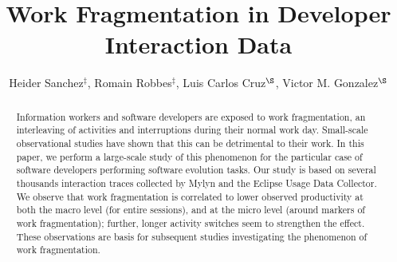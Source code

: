 \documentclass[times]{smrauth}
\begin{document}
%


\title{ Work Fragmentation in Developer Interaction Data}

\author{Heider Sanchez$^{\ddagger}$, Romain Robbes$^{\ddagger}$, Luis Carlos Cruz$^{\S}$, Victor M. Gonzalez$^{\S}$}

\address{$^{\ddagger}$: Computer Science Department (DCC), University of Chile, Chile;
$^{\S}$: Instituto Tecnologico Autonomo de Mexico, Mexico}


\maketitle





\begin{abstract}
Information workers and software developers are exposed to work fragmentation, an interleaving of activities and interruptions during their normal work day. Small-scale observational studies have shown that this can be detrimental to their work. In this paper, we perform a large-scale study of this phenomenon for the particular case of software developers performing software evolution tasks. Our study is based on several thousands interaction traces collected by Mylyn and the Eclipse Usage Data Collector. We observe that work fragmentation is correlated to lower observed productivity at both the macro level (for entire sessions), and at the micro level (around markers of work fragmentation); further, longer activity switches seem to strengthen the effect. These observations are basis for subsequent studies investigating the phenomenon of work fragmentation.
\end{abstract}


\end{document}
